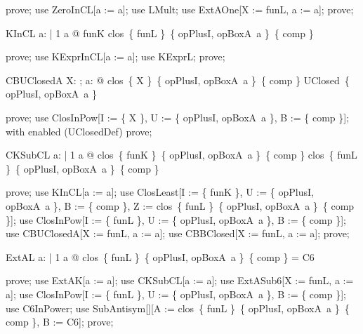 \documentclass{article}
\begin{document}
\begin{zproof}
prove;
use ZeroInCL[a := a];
use LMult;
use ExtAOne[X := funL, a := a];
prove;
\end{zproof}

\begin{theorem}{KInCL}
  \forall a: \nat | 1 \leq a @ funK \in clos~\{ funL \}~\{ opPlusI, opBoxA~a \}~\{ comp \}
\end{theorem}

\begin{zproof}
prove;
use KExprInCL[a := a];
use KExprL;
prove;
\end{zproof}

\begin{theorem}{CBUClosedA}
  \forall X: \nat \fun \nat; a: \nat @ clos~\{ X \}~\{ opPlusI, opBoxA~a \}~\{ comp \} \in UClosed~\{ opPlusI, opBoxA~a \}
\end{theorem}

\begin{zproof}
prove;
use ClosInPow[I := \{ X \}, U := \{ opPlusI, opBoxA~a \}, B := \{ comp \}];
with enabled (UClosedDef) prove;
\end{zproof}

\begin{theorem}{CKSubCL}
  \forall a: \nat | 1 \leq a @ clos~\{ funK \}~\{ opPlusI, opBoxA~a \}~\{ comp \} \subseteq clos~\{ funL \}~\{ opPlusI, opBoxA~a \}~\{ comp \}
\end{theorem}

\begin{zproof}
prove;
use KInCL[a := a];
use ClosLeast[I := \{ funK \}, U := \{ opPlusI, opBoxA~a \}, B := \{ comp \}, Z := clos~\{ funL \}~\{ opPlusI, opBoxA~a \}~\{ comp \}];
use ClosInPow[I := \{ funL \}, U := \{ opPlusI, opBoxA~a \}, B := \{ comp \}];
use CBUClosedA[X := funL, a := a];
use CBBClosed[X := funL, a := a];
prove;
\end{zproof}

\begin{theorem}{ExtAL}
  \forall a: \nat | 1 \leq a @ clos~\{ funL \}~\{ opPlusI, opBoxA~a \}~\{ comp \} = C6
\end{theorem}

\begin{zproof}
prove;
use ExtAK[a := a];
use CKSubCL[a := a];
use ExtASub6[X := funL, a := a];
use ClosInPow[I := \{ funL \}, U := \{ opPlusI, opBoxA~a \}, B := \{ comp \}];
use C6InPower;
use SubAntisym[\nat \fun \nat][A := clos~\{ funL \}~\{ opPlusI, opBoxA~a \}~\{ comp \}, B := C6];
prove;
\end{zproof}
\end{document}
